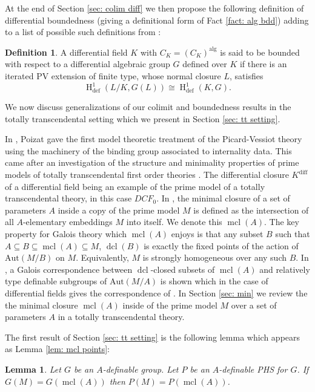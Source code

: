 \documentclass{amsart}
\newtheorem{lemma}[theorem]{Lemma}
\theoremstyle{definition}
\newtheorem{definition}[theorem]{Definition}
\theoremstyle{remark}
\numberwithin{equation}{section}
\def \defin {\operatorname{def}}
\def \HH {\operatorname{H}}
\def \diff {\operatorname{diff}}
\def \alg {\operatorname{alg}}
\def \aut {\text{Aut}}
\def \mcl {\operatorname{mcl}}
\def \dcl {\operatorname{dcl}}
\begin{document}
At the end of Section \ref{sec: colim diff} we then propose the following definition of differential boundedness (giving a definitional form of Fact \ref{fact: alg bdd}) adding to a list of possible such definitions from \cite{AnandDavidComm}:

\begin{definition}\relax
    A differential field $K$ with $C_K = (C_K)^{\alg}$ is said to be bounded with respect to a differential algebraic group $G$ defined over $K$ if there is an iterated PV extension of finite type, whose normal closure $L$, satisfies $$\HH^1_{\defin}(L/K,G(L)) \cong \HH^1_{\defin}(K,G).$$
\end{definition}

We now discuss generalizations of our colimit and boundedness results in the totally transcendental setting which we present in Section \ref{sec: tt setting}.

In \cite{poizatimaginare}, Poizat gave the first model theoretic treatment of the Picard-Vessiot theory using the machinery of the binding group associated to internality data. This came after an investigation of the structure and minimality properties of prime models of totally transcendental first order theories \cite{PoizatPrime}.  The differential closure $K^{\diff}$ of a differential field being an example of the prime model of a totally transcendental theory, in this case $DCF_0$. In \cite{PoizatPrime}, the minimal closure of a set of parameters $A$ inside a copy of the prime model $M$ is defined as the intersection of all $A$-elementary embeddings $M$ into itself. We denote this $\mcl(A)$. The key property for Galois theory which $\mcl(A)$ enjoys is that any subset $B$ such that $A \subseteq B \subseteq \mcl(A) \subseteq M$, $\dcl(B)$ is exactly the fixed points of the action of $\aut(M/B)$ on $M$. Equivalently, $M$ is strongly homogeneous over any such $B$. In \cite{meretzky2026galoistheoryautomorphismgroups}, a Galois correspondence between $\dcl$-closed subsets of $\mcl(A)$ and relatively type definable subgroups of $\aut(M/A)$ is shown which in the case of differential fields gives the correspondence of \cite{magid2022completepicardvessiotclosure}.  In Section \ref{sec: min} we review the the minimal closure $\mcl(A)$ inside of  the prime model $M$ over a set of parameters $A$ in a totally transcendental theory. 

The first result of Section \ref{sec: tt setting} is the following lemma which appears as Lemma \ref{lem: mcl points}:

\begin{lemma}\relax
    Let $G$ be an $A$-definable group. Let $P$ be an $A$-definable PHS for $G$. If $G(M) = G(\mcl(A))$ then $P(M) = P(\mcl(A))$. 
\end{lemma} 
\end{document}
